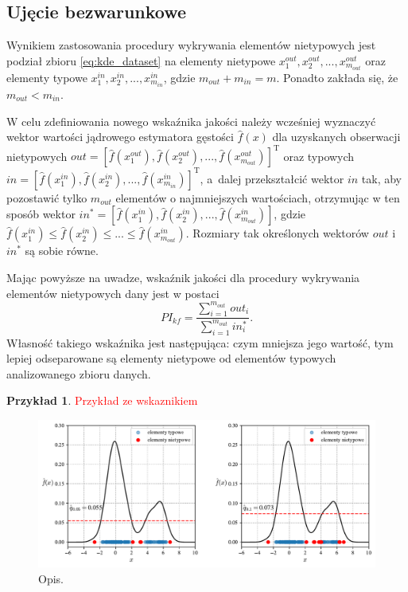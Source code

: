 \documentclass[12pt,a4paper,oneside]{book}
\theoremstyle{definition}
\newtheorem{exmp}{Przykład}[chapter]
\begin{document}
\subsection*{Ujęcie bezwarunkowe}

Wynikiem zastosowania procedury wykrywania elementów nietypowych jest podział zbioru \eqref{eq:kde_dataset} na elementy nietypowe $x_1^{out}, x_2^{out},...,x_{m_{out}}^{out}$ oraz elementy typowe $x_1^{in}, x_2^{in},...,x_{m_{in}}^{in}$, gdzie $m_{out}+m_{in}=m$. Ponadto zakłada się, że $m_{out} < m_{in}$.

W celu zdefiniowania nowego wskaźnika jakości należy wcześniej wyznaczyć wektor wartości jądrowego estymatora gęstości $\hat{f}(x)$ dla uzyskanych obserwacji nietypowych $out=[\hat{f}(x_1^{out}), \hat{f}(x_2^{out}),..., \hat{f}(x_{m_{out}}^{out})]^\mathrm{T}$ oraz typowych $in=[\hat{f}(x_1^{in}), \hat{f}(x_2^{in}),..., \hat{f}(x_{m_{in}}^{in})]^\mathrm{T}$, a~dalej przekształcić wektor $in$ tak, aby pozostawić tylko $m_{out}$ elementów o najmniejszych wartościach, otrzymując w ten sposób wektor $in^*=[\hat{f}(x_1^{in}), \hat{f}(x_2^{in}),..., \hat{f}(x_{m_{out}}^{in})]$, gdzie $\hat{f}(x_1^{in}) \leq \hat{f}(x_2^{in}) \leq ... \leq \hat{f}(x_{m_{out}}^{in})$. Rozmiary tak określonych wektorów $out$ i $in^*$ są sobie równe.

Mając powyższe na uwadze, wskaźnik jakości dla procedury wykrywania elementów nietypowych dany jest w postaci
\begin{equation}
PI_{kf} = \frac{\sum_{i=1}^{m_{out}} out_i}{\sum_{i=1}^{m_{out}} in_i^*}.
\end{equation}
Własność takiego wskaźnika jest następująca: czym mniejsza jego wartość, tym lepiej odseparowane są elementy nietypowe od elementów typowych analizowanego zbioru danych.

\begin{exmp}
\textcolor{red}{Przykład ze wskaznikiem}
\begin{figure}[H]
    \centering
    \includegraphics[scale=0.6]{outliers_detection_example_eval}
    \vspace{-0.5cm} 
    \caption{Opis.}
\end{figure}
\end{exmp}
\end{document}
